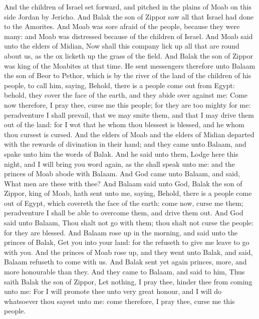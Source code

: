 \begin{biblechapter} %
 And the children of Israel set forward, and pitched in the plains of Moab on this side Jordan by Jericho.
\verse And Balak the son of Zippor saw all that Israel had done to the Amorites.
\verse And Moab was sore afraid of the people, because they were many: and Moab was distressed because of the children of Israel.
\verse And Moab said unto the elders of Midian, Now shall this company lick up all that are round about us, as the ox licketh up the grass of the field. And Balak the son of Zippor was king of the Moabites at that time.
\verse He sent messengers therefore unto Balaam the son of Beor to Pethor, which is by the river of the land of the children of his people, to call him, saying, Behold, there is a people come out from Egypt: behold, they cover the face of the earth, and they abide over against me:
\verse Come now therefore, I pray thee, curse me this people; for they are too mighty for me: peradventure I shall prevail, that we may smite them, and that I may drive them out of the land: for I wot that he whom thou blessest is blessed, and he whom thou cursest is cursed.
\verse And the elders of Moab and the elders of Midian departed with the rewards of divination in their hand; and they came unto Balaam, and spake unto him the words of Balak.
\verse And he said unto them, Lodge here this night, and I will bring you word again, as the \LORD shall speak unto me: and the princes of Moab abode with Balaam.
\verse And God came unto Balaam, and said, What men are these with thee?
\verse And Balaam said unto God, Balak the son of Zippor, king of Moab, hath sent unto me, saying,
\verse Behold, there is a people come out of Egypt, which covereth the face of the earth: come now, curse me them; peradventure I shall be able to overcome them, and drive them out.
\verse And God said unto Balaam, Thou shalt not go with them; thou shalt not curse the people: for they are blessed.
\verse And Balaam rose up in the morning, and said unto the princes of Balak, Get you into your land: for the \LORD refuseth to give me leave to go with you.
\verse And the princes of Moab rose up, and they went unto Balak, and said, Balaam refuseth to come with us.
\verse And Balak sent yet again princes, more, and more honourable than they.
\verse And they came to Balaam, and said to him, Thus saith Balak the son of Zippor, Let nothing, I pray thee, hinder thee from coming unto me:
\verse For I will promote thee unto very great honour, and I will do whatsoever thou sayest unto me: come therefore, I pray thee, curse me this people.

\end{biblechapter}
